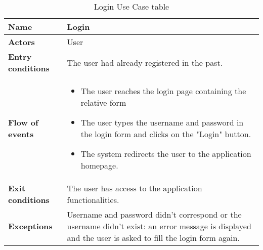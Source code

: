 \begin{table}[!htbp]
	\hypertarget{tab:loginusecase}{}
\centering
\begin{tabular}{lp{8cm}}
\bf\large Name&\bf\large Login\\
\hline
\hline
\bf Actors&User\\
\hline
\bf Entry conditions&The user had already registered in the past.\\
\hline
\bf Flow of events&
\begin{itemize}
\item The user reaches the login page containing the relative form
\item The user types the username and password in the login form and clicks on the "Login" button.
\item The system redirects the user to the application homepage.
\end{itemize}
\\
\hline
\bf Exit conditions&The user has access to the application functionalities. \\
\hline
\bf Exceptions&Username and password didn't correspond or the username didn't exist: an error message is displayed and the user is asked to fill the login form again.\\
\hline

\end{tabular}

\caption{Login Use Case table} \label{tab:login}
\end{table}